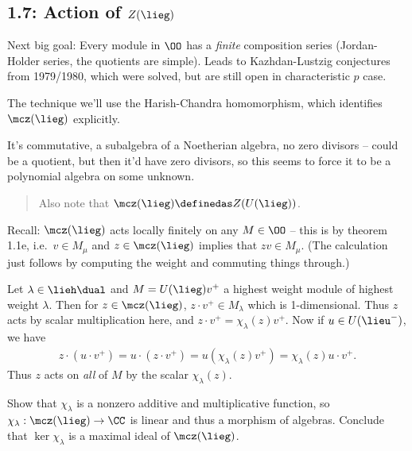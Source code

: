 \hypertarget{action-of-zlieg}{%
\subsection{\texorpdfstring{1.7: Action of
\(Z(\lieg)\)}{1.7: Action of Z(\textbackslash lieg)}}\label{action-of-zlieg}}

Next big goal: Every module in \(\OO\) has a \emph{finite} composition
series (Jordan-Holder series, the quotients are simple). Leads to
Kazhdan-Lustzig conjectures from 1979/1980, which were solved, but are
still open in characteristic \(p\) case.

The technique we'll use the Harish-Chandra homomorphism, which
identifies \(\mcz(\lieg)\) explicitly.

It's commutative, a subalgebra of a Noetherian algebra, no zero divisors
-- could be a quotient, but then it'd have zero divisors, so this seems
to force it to be a polynomial algebra on some unknown.

\begin{quote}
Also note that \(\mcz(\lieg) \definedas Z(U(\lieg))\).
\end{quote}

Recall: \(\mcz(\lieg)\) acts locally finitely on any \(M\in \OO\) --
this is by theorem 1.1e, i.e.~\(v\in M_\mu\) and \(z\in \mcz(\lieg)\)
implies that \(zv\in M_\mu\). (The calculation just follows by computing
the weight and commuting things through.)

Let \(\lambda \in \lieh\dual\) and \(M = U(\lieg)v^+\) a highest weight
module of highest weight \(\lambda\). Then for \(z\in \mcz(\lieg)\),
\(z\cdot v^+ \in M_\lambda\) which is 1-dimensional. Thus \(z\) acts by
scalar multiplication here, and \(z\cdot v^+ = \chi_\lambda(z) v^+\).
Now if \(u\in U(\lieu^-)\), we have
\begin{align*}z\cdot(u\cdot v^+) = u\cdot(z\cdot v^+) = u(\chi_\lambda(z)v^+) = \chi_\lambda(z) u\cdot v^+.\end{align*}
Thus \(z\) acts on \emph{all} of \(M\) by the scalar
\(\chi_\lambda(z)\).

\begin{description}
\tightlist
\item[Exercise]
Show that \(\chi_\lambda\) is a nonzero additive and multiplicative
function, so \(\chi_\lambda: \mcz(\lieg) \to \CC\) is linear and thus a
morphism of algebras. Conclude that \(\ker \chi_\lambda\) is a maximal
ideal of \(\mcz(\lieg)\).
\end{description}

